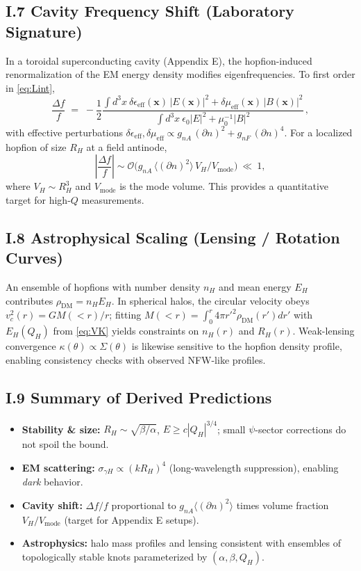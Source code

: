 \subsection*{I.7 Cavity Frequency Shift (Laboratory Signature)}
In a toroidal superconducting cavity (Appendix E), the hopfion-induced renormalization of the EM energy density modifies eigenfrequencies. 
To first order in \eqref{eq:Lint},
\begin{equation}
\frac{\Delta f}{f} \;=\; -\frac{1}{2}\frac{\int d^3x\ \delta\epsilon_{\mathrm{eff}}(\mathbf{x})\, |E(\mathbf{x})|^2 + \delta\mu_{\mathrm{eff}}(\mathbf{x})\, |B(\mathbf{x})|^2}{\int d^3x\ \epsilon_0 |E|^2 + \mu_0^{-1}|B|^2}\,,
\end{equation}
with effective perturbations $\delta\epsilon_{\mathrm{eff}},\delta\mu_{\mathrm{eff}}\propto g_{nA}\,(\partial n)^2 + g_{nF}\,(\partial n)^4$. 
For a localized hopfion of size $R_H$ at a field antinode,
\begin{equation}
\left|\frac{\Delta f}{f}\right| \sim \mathcal{O}\!\big( g_{nA}\, \langle(\partial n)^2\rangle\, V_H/V_{\mathrm{mode}} \big)\ \ll\ 1,
\end{equation}
where $V_H\sim R_H^3$ and $V_{\mathrm{mode}}$ is the mode volume. This provides a quantitative target for high-$Q$ measurements.

\subsection*{I.8 Astrophysical Scaling (Lensing / Rotation Curves)}
An ensemble of hopfions with number density $n_H$ and mean energy $E_H$ contributes $\rho_{\mathrm{DM}}=n_H E_H$. 
In spherical halos, the circular velocity obeys $v_c^2(r)=G M(<r)/r$; fitting $M(<r)=\int_0^r 4\pi r'^2 \rho_{\mathrm{DM}}(r')dr'$ with $E_H(Q_H)$ from \eqref{eq:VK} yields constraints on $n_H(r)$ and $R_H(r)$. 
Weak-lensing convergence $\kappa(\theta)\propto\Sigma(\theta)$ is likewise sensitive to the hopfion density profile, enabling consistency checks with observed NFW-like profiles.

\subsection*{I.9 Summary of Derived Predictions}
\begin{itemize}
\item \textbf{Stability \& size:} $R_H\sim \sqrt{\beta/\alpha}$, $E\ge c|Q_H|^{3/4}$; small $\psi$-sector corrections do not spoil the bound.
\item \textbf{EM scattering:} $\sigma_{\gamma H}\propto (k R_H)^4$ (long-wavelength suppression), enabling \emph{dark} behavior.
\item \textbf{Cavity shift:} $\Delta f/f$ proportional to $g_{nA}\langle(\partial n)^2\rangle$ times volume fraction $V_H/V_{\mathrm{mode}}$ (target for Appendix E setups).
\item \textbf{Astrophysics:} halo mass profiles and lensing consistent with ensembles of topologically stable knots parameterized by $(\alpha,\beta,Q_H)$.
\end{itemize}

